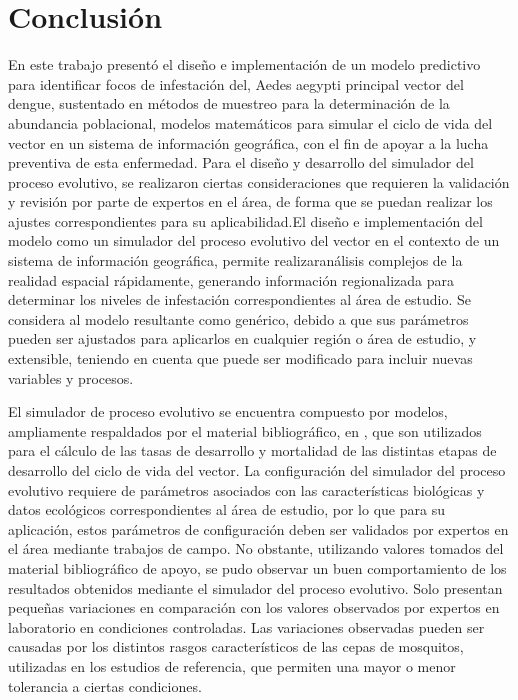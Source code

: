 \section{Conclusión}
En este trabajo presentó el diseño e implementación de un modelo predictivo para identificar focos
de infestación del, Aedes aegypti principal vector del dengue, sustentado en métodos de muestreo
para la determinación de la abundancia poblacional, modelos matemáticos para simular el ciclo de
vida del vector en un sistema de información geográfica, con el fin de apoyar a la lucha
preventiva de esta enfermedad. Para el diseño y desarrollo del simulador del proceso evolutivo, se
realizaron ciertas consideraciones que requieren la validación y revisión por parte de expertos en
el área, de forma que se puedan realizar los ajustes correspondientes para su aplicabilidad.El diseño e implementación del modelo como un simulador del proceso evolutivo del vector en el contexto de un sistema de información geográfica, permite realizaranálisis complejos de la realidad espacial rápidamente, generando información regionalizada para determinar los niveles de infestación correspondientes al área de estudio. Se considera al modelo resultante como genérico, debido a que sus parámetros pueden ser ajustados para aplicarlos en cualquier región o área de estudio, y extensible, teniendo en cuenta que puede ser modificado para incluir nuevas variables y procesos.

El simulador de proceso evolutivo se encuentra compuesto por modelos, ampliamente respaldados por
el material bibliográfico, en \cite{sharpe1977reaction, focks1993dynamic, schoolfield1981non, otero2006stochastic, rueda1990temperature}, que son utilizados para el cálculo de las tasas de
desarrollo y mortalidad de las distintas etapas de desarrollo del ciclo de vida del vector. La
configuración del simulador del proceso evolutivo requiere de parámetros asociados con las
características biológicas y datos ecológicos correspondientes al área de estudio, por lo que para
su aplicación, estos parámetros de configuración deben ser validados por expertos en el área
mediante trabajos de campo. No obstante, utilizando valores tomados del material bibliográfico de
apoyo, se pudo observar un buen comportamiento de los resultados obtenidos mediante el simulador
del proceso evolutivo. Solo presentan pequeñas variaciones en comparación con los valores
observados por expertos en laboratorio en condiciones controladas. Las variaciones observadas
pueden ser causadas por los distintos rasgos característicos de las cepas de mosquitos, utilizadas
en los estudios de referencia, que permiten una mayor o menor tolerancia a ciertas condiciones.

